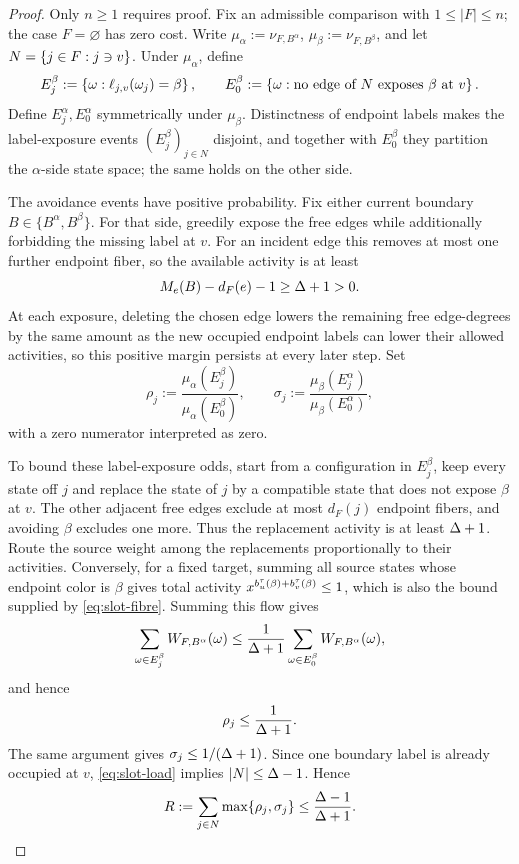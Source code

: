 \begin{proof}
Only \(n\ge1\) requires proof.  Fix an admissible comparison with
$1\le |F|\le n$; the case $F=\varnothing$ has zero cost.  Write
\(\mu_\alpha:=\nu_{F,B^\alpha}\),
\(\mu_\beta:=\nu_{F,B^\beta}\), and let
\(N=\left\{j\in F:j\ni v\right\}\).  Under \(\mu_\alpha\), define
\[
  E_j^\beta
  :=\left\{\omega:\ell_{j,v}(\omega_j)=\beta\right\},
  \qquad
  E_0^\beta
  :=\left\{\omega:\text{no edge of \(N\) exposes \(\beta\) at \(v\)}\right\}.
\]
Define \(E_j^\alpha,E_0^\alpha\) symmetrically under \(\mu_\beta\).
Distinctness of endpoint labels makes the label-exposure events
\((E_j^\beta)_{j\in N}\) disjoint, and together with \(E_0^\beta\) they
partition the \(\alpha\)-side state space; the same holds on the other
side.

The avoidance events have positive probability.  Fix either current
boundary \(B\in\{B^\alpha,B^\beta\}\).  For that side, greedily expose
the free edges while additionally forbidding the missing label at \(v\).
For an incident edge this removes at most one further endpoint fiber, so
the available activity is at least
\[
  M_e(B)-d_F(e)-1\ge\Delta+1>0.
\]
At each exposure, deleting the chosen edge lowers the remaining free
edge-degrees by the same amount as the new occupied endpoint labels can
lower their allowed activities, so this positive margin persists at every
later step.
Set
\[
  \rho_j
  :=\frac{\mu_\alpha(E_j^\beta)}{\mu_\alpha(E_0^\beta)},
  \qquad
  \sigma_j
  :=\frac{\mu_\beta(E_j^\alpha)}{\mu_\beta(E_0^\alpha)},
\]
with a zero numerator interpreted as zero.

To bound these label-exposure odds, start from a configuration in
\(E_j^\beta\), keep every state off \(j\) and replace the state of \(j\)
by a compatible state that does not expose \(\beta\) at \(v\).  The other
adjacent free edges exclude at most \(d_F(j)\) endpoint fibers, and
avoiding \(\beta\) excludes one more.  Thus the replacement activity is at
least \(\Delta+1\).  Route the source weight among the replacements
proportionally to their activities.  Conversely, for a fixed target, summing
all source states whose endpoint color is \(\beta\) gives total activity
\(x^{b_u^\tau(\beta)+b_v^\tau(\beta)}\le1\),
which is also the bound supplied by \eqref{eq:slot-fibre}.  Summing this flow gives
\[
  \sum_{\omega\in E_j^\beta}W_{F,B^\alpha}(\omega)
  \le\frac1{\Delta+1}
       \sum_{\omega\in E_0^\beta}W_{F,B^\alpha}(\omega),
\]
and hence
\[
  \rho_j\le\frac1{\Delta+1}.
\]
The same argument gives \(\sigma_j\le1/(\Delta+1)\).  Since one boundary
label is already occupied at \(v\), \eqref{eq:slot-load} implies
\(\left|N\right|\le\Delta-1\).  Hence
\begin{equation}\label{eq:edge-occurrence-budget}
  R:=\sum_{j\in N}\max\{\rho_j,\sigma_j\}
  \le\frac{\Delta-1}{\Delta+1}.
\end{equation}


\end{proof}

